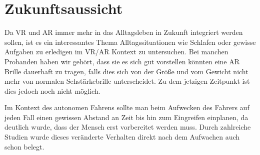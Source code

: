 \section{Zukunftsaussicht}


Da VR und AR immer mehr in das Alltagsleben in Zukunft integriert werden sollen, ist es ein interessantes Thema Alltagssituationen wie Schlafen oder gewisse Aufgaben zu erledigen im VR/AR Kontext zu untersuchen. Bei manchen Probanden haben wir gehört, dass sie es sich gut vorstellen könnten eine AR Brille dauerhaft zu tragen, falls dies sich von der Größe und vom Gewicht nicht mehr von normalen Sehstärkebrille unterscheidet. Zu dem jetzigen Zeitpunkt ist dies jedoch noch nicht möglich.

Im Kontext des autonomen Fahrens sollte man beim Aufwecken des Fahrers auf jeden Fall einen gewissen Abstand an Zeit bis hin zum Eingreifen einplanen, da deutlich wurde, dass der Mensch erst vorbereitet werden muss. Durch zahlreiche Studien wurde dieses veränderte Verhalten direkt nach dem Aufwachen auch schon belegt.
